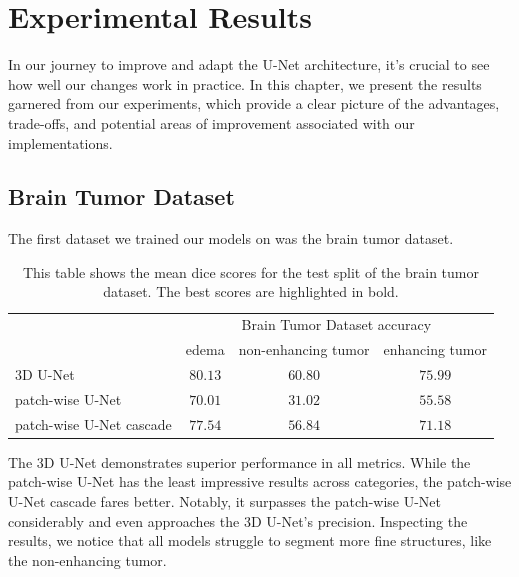 \chapter{Experimental Results}

In our journey to improve and adapt the U-Net architecture, it's crucial to see how well our changes work in practice. In this chapter,
we present the results garnered from our experiments, which provide a clear picture of the advantages, trade-offs, and potential areas of improvement associated with our implementations.

\section{Brain Tumor Dataset}
The first dataset we trained our models on was the brain tumor dataset.

\begin{table}[ht!]
\begin{center} {\footnotesize
\begin{tabular}{lccc}
\hline
	& \multicolumn{3}{c}{Brain Tumor Dataset accuracy} \\
	& \multicolumn{1}{c}{edema} & \multicolumn{1}{c}{non-enhancing tumor} & \multicolumn{1}{c}{enhancing tumor}\\
\hline
$3$D U-Net & $\mathbf{80.13}$ & $\mathbf{60.80}$ & $\mathbf{75.99}$ \\[1ex]
patch-wise U-Net & $70.01$ & $31.02$ & $55.58$ \\[1ex]
patch-wise U-Net cascade & $77.54$ & $56.84$ & $71.18$ \\[1ex]
\hline
\end{tabular} }
\end{center}
\caption{\footnotesize This table shows the mean dice scores for the test split of the brain tumor dataset. The best scores are highlighted in bold.}
\label{tab:bt-accuracy}
\end{table}

\noindent The $3$D U-Net demonstrates superior performance in all metrics. While the patch-wise U-Net has the least impressive results across categories, the patch-wise U-Net cascade fares better.
Notably, it surpasses the patch-wise U-Net considerably and even approaches the 3D U-Net's precision.
Inspecting the results, we notice that all models struggle to segment more fine structures, like the non-enhancing tumor.\newpage

